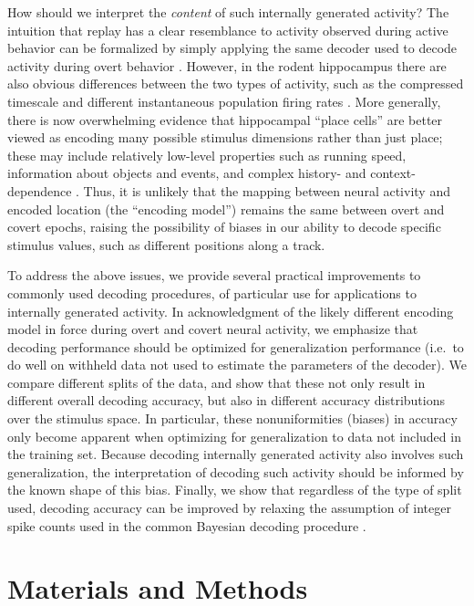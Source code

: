 \documentclass[11pt]{article}
\let\cite=\citep
\begin{document}
How should we interpret the {\it content} of such internally generated
activity? The intuition that replay has a clear resemblance to
activity observed during active behavior can be formalized by simply
applying the same decoder used to decode activity during overt
behavior \cite{Tatsuno2006,Kloosterman2012,Shirer2012}. However, in
the rodent hippocampus there are also obvious differences between the
two types of activity, such as the compressed timescale and different
instantaneous population firing rates
\cite{Skaggs1996a,Lee2002,Buzsaki2015a}. More generally, there is now
overwhelming evidence that hippocampal ``place cells'' are better
viewed as encoding many possible stimulus dimensions rather than just
place; these may include relatively low-level properties such as
running speed, information about objects and events, and complex
history- and context-dependence
\cite{Huxter2003,Lin2005,McKenzie2014,Allen2016}. Thus, it is unlikely
that the mapping between neural activity and encoded location (the
``encoding model'') remains the same between overt and covert epochs,
raising the possibility of biases in our ability to decode specific
stimulus values, such as different positions along a track.

To address the above issues, we provide several practical improvements
to commonly used decoding procedures, of particular use for
applications to internally generated activity. In acknowledgment of
the likely different encoding model in force during overt and covert
neural activity, we {\color{black} emphasize} that decoding performance
should be optimized for generalization performance (i.e.\ to do well
on withheld data not used to estimate the parameters of the
decoder). We compare different splits of the data, and show that these
not only result in different overall decoding accuracy, but also in
different accuracy distributions {\color{black} over the stimulus
  space. In particular, these nonuniformities (biases) in accuracy
  only become apparent when optimizing for generalization to data not
  included in the training set. Because decoding internally generated
  activity also involves such generalization, the interpretation of
  decoding such activity should be informed by the known shape of this
  bias.}  Finally, we show that regardless of the type of split used,
decoding accuracy can be improved by relaxing the assumption of
integer spike counts used in the common Bayesian decoding procedure
{\color{black} \cite{Zhang1998,johnson07jnsci,Pfeiffer2013}}.

\section*{Materials and Methods}
\end{document}
